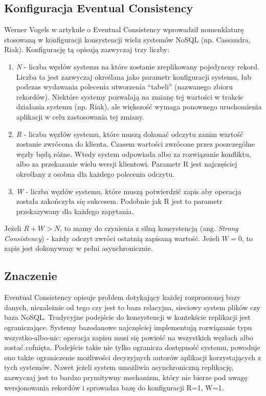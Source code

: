 \subsection*{Konfiguracja Eventual Consistency}

Werner Vogels w artykule o Eventual Consistency \cite{vogels-eventually-consistent} wprowadził nomenklaturę stosowaną w konfiguracji konsystencji wielu systemów NoSQL (np. Cassandra, Riak).
Konfigurację tą opisują zazwyczaj trzy liczby:

\begin{enumerate}
 \item \emph{N} - liczba węzłów systemu na które zostanie zreplikowany pojedynczy rekord.
 Liczba ta jest zazwyczaj określana jako parametr konfiguracji systemu, lub podczas wydawania polecenia utworzenia ``tabeli'' (nazwanego zbioru rekordów).
 Niektóre systemy pozwalają na zmianę tej wartości w trakcie działania systemu (np. Riak), ale większość wymaga ponownego uruchomienia aplikacji w celu zastosowania tej zmiany.
 \item \emph{R} - liczba węzłów systemu, które muszą dokonać odczytu zanim wartość zostanie zwrócona do klienta.
 Czasem wartości zwrócone przez poszczególne węzły będą różne.
 Wtedy system  odpowiada albo za rozwiązanie konfliktu, albo za przekazanie wielu wersji klientowi.
 Parametr R jest najczęściej określany z osobna dla każdego polecenia odczytu.
 \item \emph{W} - liczba węzłów systemu, które muszą potwierdzić zapis aby operacja została zakończyła się sukcesem.
 Podobnie jak R jest to parametr przekazywany dla każdego zapytania.
\end{enumerate}

Jeżeli $R+W>N$, to mamy do czynienia z silną konsystencją (ang. \emph{Strong Consistency}) - każdy odczyt zwróci ostatnią zapisaną wartość.
Jeżeli $W = 0$, to zapis jest dokonywany w pełni asynchronicznie.

\subsection*{Znaczenie}

Eventual Consistency opisuje problem dotykający każdej rozproszonej bazy danych, niezależnie od tego czy jest to baza relacyjna, sieciowy system plików czy baza NoSQL.
Tradycyjne podejście do konsystencji w kontekście replikacji jest ograniczające.
Systemy bazodanowe najczęściej implementują rozwiązanie typu wszystko-albo-nic: operacja zapisu musi się powieść na wszystkich węzłach albo zostać cofnięta.
Podejście takie nie tylko ogranicza dostępność systemu, powoduje ono także ograniczenie możliwości decyzyjnych autorów aplikacji korzystających z tych systemów.
Nawet jeżeli system umożliwia asynchroniczną replikację, zazwyczaj jest to bardzo prymitywny mechanizm, który nie bierze pod uwagę wersjonowania rekordów i sprowadza bazę do konfiguracji R=1, W=1.

